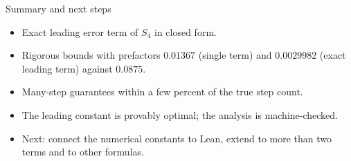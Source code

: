 \documentclass[11pt,aspectratio=169]{beamer}
\begin{document}
\begin{frame}{Summary and next steps}
\begin{itemize}[<+->]
\item Exact leading error term of $S_4$ in closed form.
\item Rigorous bounds with prefactors $0.01367$ (single term) and $0.0029982$ (exact leading term) against $0.0875$.
\item Many-step guarantees within a few percent of the true step count.
\item The leading constant is provably optimal; the analysis is machine-checked.
\item Next: connect the numerical constants to Lean, extend to more than two terms and to other formulas.
\end{itemize}
\vspace{0.8em}
\end{frame}
\end{document}
